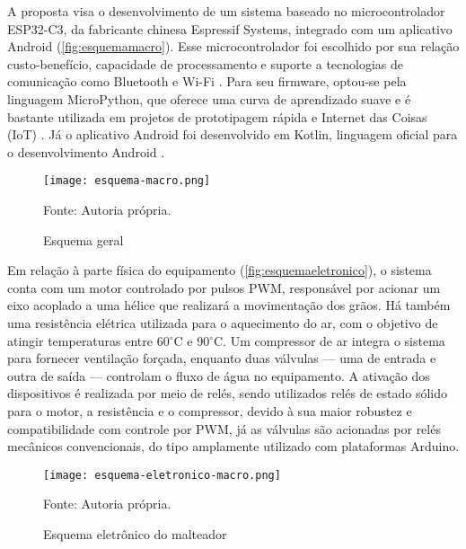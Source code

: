A proposta visa o desenvolvimento de um sistema baseado no microcontrolador ESP32-C3, da fabricante chinesa Espressif Systems, integrado com um aplicativo Android (\autoref{fig:esquemamacro}). Esse microcontrolador foi escolhido por sua relação custo-benefício, capacidade de processamento e suporte a tecnologias de comunicação como Bluetooth e Wi-Fi \cite{rodrigues2021controle, santos2019sistema}. Para seu firmware, optou-se pela linguagem MicroPython, que oferece uma curva de aprendizado suave e é bastante utilizada em projetos de prototipagem rápida e Internet das Coisas (IoT) \cite{TOLLERVEY2017, brito2020automaccao}. Já o aplicativo Android foi desenvolvido em Kotlin, linguagem oficial para o desenvolvimento Android \cite{sempreupdate_kotlin_2020}.

\begin{figure}[ht]
    \centering
    \caption{Esquema geral}
    \label{fig:esquemamacro}
    \texttt{[image: esquema-macro.png]}

    {\centering\footnotesize Fonte: Autoria própria.\par}
\end{figure}

Em relação à parte física do equipamento (\autoref{fig:esquemaeletronico}), o sistema conta com um motor controlado por pulsos PWM, responsável por acionar um eixo acoplado a uma hélice que realizará a movimentação dos grãos. Há também uma resistência elétrica utilizada para o aquecimento do ar, com o objetivo de atingir temperaturas entre 60$^{\circ}$C e 90$^{\circ}$C. Um compressor de ar integra o sistema para fornecer ventilação forçada, enquanto duas válvulas — uma de entrada e outra de saída — controlam o fluxo de água no equipamento. A ativação dos dispositivos é realizada por meio de relés, sendo utilizados relés de estado sólido para o motor, a resistência e o compressor, devido à sua maior robustez e compatibilidade com controle por PWM, já as válvulas são acionadas por relés mecânicos convencionais, do tipo amplamente utilizado com plataformas Arduino.

\begin{figure}[ht]
    \centering
    \caption{Esquema eletrônico do malteador}
    \label{fig:esquemaeletronico}
    \texttt{[image: esquema-eletronico-macro.png]}

    {\centering\footnotesize Fonte: Autoria própria.\par}
\end{figure}

